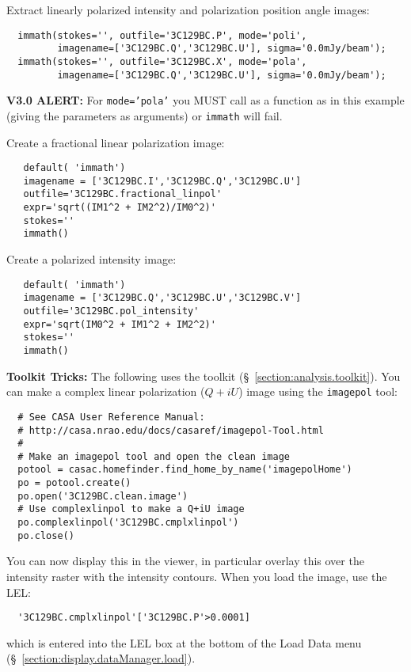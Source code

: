 Extract linearly polarized intensity and polarization position angle images:
\small
\begin{verbatim}
  immath(stokes='', outfile='3C129BC.P', mode='poli', 
         imagename=['3C129BC.Q','3C129BC.U'], sigma='0.0mJy/beam'); 
  immath(stokes='', outfile='3C129BC.X', mode='pola', 
         imagename=['3C129BC.Q','3C129BC.U'], sigma='0.0mJy/beam'); 
\end{verbatim}
\normalsize
{\bf V3.0 ALERT:} For {\tt mode='pola'} you MUST call as a function as
in this example (giving the parameters as arguments) or {\tt immath}
will fail.

Create a fractional linear polarization image:
\small
\begin{verbatim}
   default( 'immath')
   imagename = ['3C129BC.I','3C129BC.Q','3C129BC.U']
   outfile='3C129BC.fractional_linpol'
   expr='sqrt((IM1^2 + IM2^2)/IM0^2)'
   stokes=''
   immath()
\end{verbatim}
\normalsize

Create a polarized intensity image:
\small
\begin{verbatim}
   default( 'immath')
   imagename = ['3C129BC.Q','3C129BC.U','3C129BC.V']
   outfile='3C129BC.pol_intensity'
   expr='sqrt(IM0^2 + IM1^2 + IM2^2)'
   stokes=''
   immath()
\end{verbatim}
\normalsize

{\bf Toolkit Tricks:} The following uses the toolkit 
(\S~\ref{section:analysis.toolkit}).
You can make a complex linear polarization ($Q+iU$) image using the
{\tt imagepol} tool:
\small
\begin{verbatim}
  # See CASA User Reference Manual:
  # http://casa.nrao.edu/docs/casaref/imagepol-Tool.html
  #
  # Make an imagepol tool and open the clean image 
  potool = casac.homefinder.find_home_by_name('imagepolHome')
  po = potool.create()
  po.open('3C129BC.clean.image')
  # Use complexlinpol to make a Q+iU image
  po.complexlinpol('3C129BC.cmplxlinpol')
  po.close()
\end{verbatim}
\normalsize
You can now display this in the viewer, in particular overlay this
over the intensity raster with the intensity contours.  
When you load the image, use the LEL:
\small
\begin{verbatim}
  '3C129BC.cmplxlinpol'['3C129BC.P'>0.0001]
\end{verbatim}
\normalsize
which is entered into the LEL box at the bottom of the Load Data menu
(\S~\ref{section:display.dataManager.load}).

